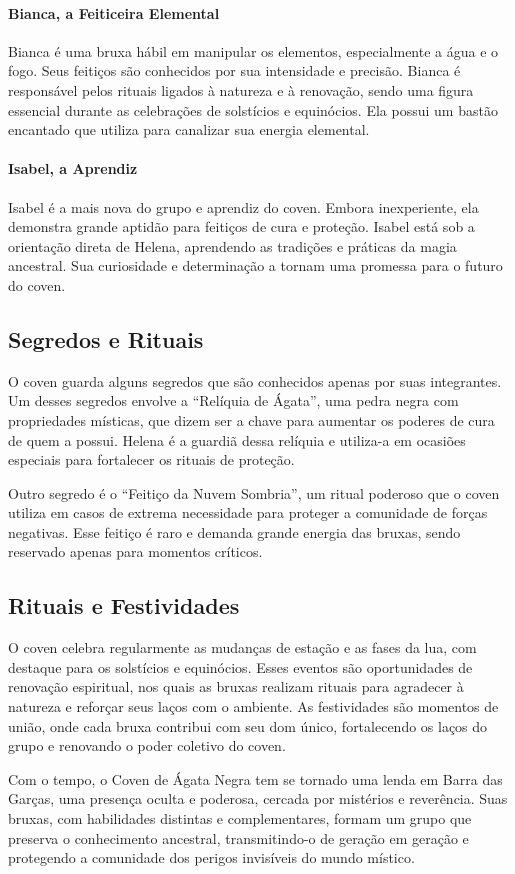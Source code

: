 \paragraph{Bianca, a Feiticeira Elemental}  
Bianca é uma bruxa hábil em manipular os elementos, especialmente a água e o fogo. Seus feitiços são conhecidos por sua intensidade e precisão. Bianca é responsável pelos rituais ligados à natureza e à renovação, sendo uma figura essencial durante as celebrações de solstícios e equinócios. Ela possui um bastão encantado que utiliza para canalizar sua energia elemental.

\paragraph{Isabel, a Aprendiz}  
Isabel é a mais nova do grupo e aprendiz do coven. Embora inexperiente, ela demonstra grande aptidão para feitiços de cura e proteção. Isabel está sob a orientação direta de Helena, aprendendo as tradições e práticas da magia ancestral. Sua curiosidade e determinação a tornam uma promessa para o futuro do coven.

\subsection{Segredos e Rituais}

O coven guarda alguns segredos que são conhecidos apenas por suas integrantes. Um desses segredos envolve a ``Relíquia de Ágata'', uma pedra negra com propriedades místicas, que dizem ser a chave para aumentar os poderes de cura de quem a possui. Helena é a guardiã dessa relíquia e utiliza-a em ocasiões especiais para fortalecer os rituais de proteção.

Outro segredo é o ``Feitiço da Nuvem Sombria'', um ritual poderoso que o coven utiliza em casos de extrema necessidade para proteger a comunidade de forças negativas. Esse feitiço é raro e demanda grande energia das bruxas, sendo reservado apenas para momentos críticos.

\subsection{Rituais e Festividades}

O coven celebra regularmente as mudanças de estação e as fases da lua, com destaque para os solstícios e equinócios. Esses eventos são oportunidades de renovação espiritual, nos quais as bruxas realizam rituais para agradecer à natureza e reforçar seus laços com o ambiente. As festividades são momentos de união, onde cada bruxa contribui com seu dom único, fortalecendo os laços do grupo e renovando o poder coletivo do coven.

Com o tempo, o Coven de Ágata Negra tem se tornado uma lenda em Barra das Garças, uma presença oculta e poderosa, cercada por mistérios e reverência. Suas bruxas, com habilidades distintas e complementares, formam um grupo que preserva o conhecimento ancestral, transmitindo-o de geração em geração e protegendo a comunidade dos perigos invisíveis do mundo místico.

